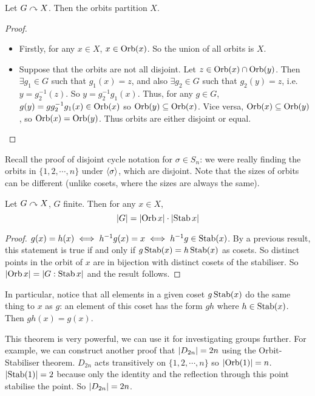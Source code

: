 \begin{lemma}
	Let \(G \curvearrowright X\).
	Then the orbits partition \(X\).
\end{lemma}
\begin{proof}
	\begin{itemize}
		\item Firstly, for any \(x \in X\), \(x \in \operatorname{Orb}(x)\).
		      So the union of all orbits is \(X\).
		\item Suppose that the orbits are not all disjoint.
		      Let \(z \in \operatorname{Orb}(x) \cap \operatorname{Orb}(y)\).
		      Then \(\exists g_1 \in G\) such that \(g_1(x) = z\), and also \(\exists g_2 \in G\) such that \(g_2(y) = z\), i.e.\ \(y = g_2^{-1}(z)\).
		      So \(y = g_2^{-1}g_1(x)\).
		      Thus, for any \(g \in G\), \(g(y) = gg_2^{-1}g_1(x) \in \operatorname{Orb}(x)\) so \(\operatorname{Orb}(y) \subseteq \operatorname{Orb}(x)\).
		      Vice versa, \(\operatorname{Orb}(x) \subseteq \operatorname{Orb}(y)\), so \(\operatorname{Orb}(x) = \operatorname{Orb}(y)\).
		      Thus orbits are either disjoint or equal.
	\end{itemize}
\end{proof}
Recall the proof of disjoint cycle notation for \(\sigma \in S_n\): we were really finding the orbits in \(\{ 1, 2, \cdots, n \}\) under \(\left\langle{} \sigma \right\rangle\), which are disjoint.
Note that the sizes of orbits can be different (unlike cosets, where the sizes are always the same).
\begin{theorem}
	Let \(G \curvearrowright X\), \(G\) finite.
	Then for any \(x \in X\),
	\[
		\abs{G} = \abs{\operatorname{Orb} x} \cdot \abs{\operatorname{Stab} x}
	\]
\end{theorem}
\begin{proof}
	\(g(x) = h(x) \iff h^{-1}g(x) = x \iff h^{-1}g \in \operatorname{Stab}(x)\).
	By a previous result, this statement is true if and only if
	\(g \operatorname{Stab}(x) = h \operatorname{Stab}(x)\) as cosets.
	So distinct points in the orbit of \(x\) are in bijection with distinct cosets of the stabiliser.
	So \(\abs{\operatorname{Orb} x} = \abs{G : \operatorname{Stab} x}\) and the result follows.
\end{proof}
In particular, notice that all elements in a given coset \(g \operatorname{Stab}(x)\) do the same thing to \(x\) as \(g\): an element of this coset has the form \(gh\) where \(h \in \operatorname{Stab}(x)\).
Then \(gh(x) = g(x)\).

This theorem is very powerful, we can use it for investigating groups further.
For example, we can construct another proof that \(\abs{D_{2n}} = 2n\) using the Orbit-Stabiliser theorem.
\(D_{2n}\) acts transitively on \(\{1, 2, \cdots, n\}\) so \(\abs{\operatorname{Orb}(1)} = n\).
\(\abs{\operatorname{Stab}(1)} = 2\) because only the identity and the reflection through this point stabilise the point.
So \(\abs{D_{2n}} = 2n\).

